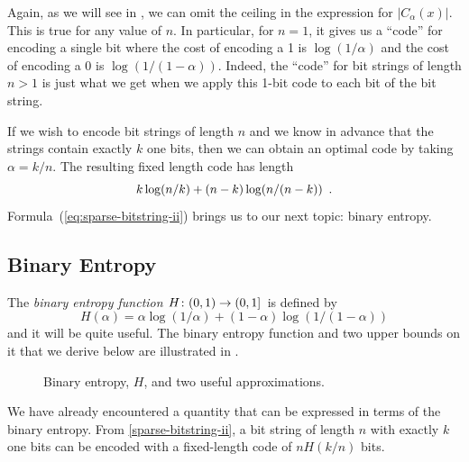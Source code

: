 \documentclass[format=acmsmall, review=false, screen=true]{acmart}
\begin{document}
Again, as we will see in , we can omit the ceiling in the
expression for $|C_\alpha(x)|$.  This is true for any value of $n$. In
particular, for $n=1$, it gives us a ``code'' for encoding a single
bit where the cost of encoding a 1 is $\log(1/\alpha)$ and the cost of
encoding a 0 is $\log(1/(1-\alpha))$.  Indeed, the ``code'' for bit
strings of length $n>1$ is just what we get when we apply this 1-bit
code to each bit of the bit string.

If we wish to encode bit strings of length $n$ and we know in advance
that the strings contain exactly $k$ one bits, then we can obtain
an optimal code 
by taking $\alpha=k/n$. The resulting fixed length
code has length
\begin{equation}
  k\log (n/k) + (n-k)\log(n/(n-k))  \eqlabel{sparse-bitstring-ii} \enspace.
\end{equation}
Formula~(\ref{eq:sparse-bitstring-ii}) brings us to our next 
topic: binary entropy.

\subsection{Binary Entropy}

The \emph{binary entropy function} $H\colon (0,1)\to(0,1]$ is defined
by
\[
  H(\alpha) = \alpha\log(1/\alpha) + (1-\alpha)\log(1/(1-\alpha)) 
\]
and it will be quite useful.  The binary entropy function and two upper
bounds on it that we derive below are illustrated in .

\begin{figure}
  \caption{Binary entropy, $H$, and two useful approximations.}
\end{figure}

We have already encountered a quantity that can be
expressed in terms of the binary entropy.  From
\eqref{sparse-bitstring-ii}, a bit string of length $n$ with
exactly $k$ one bits can be encoded with a fixed-length code of 
$nH(k/n)$ bits.
\end{document}
